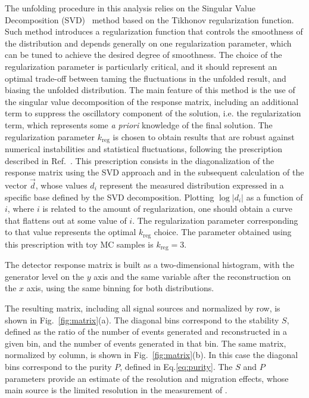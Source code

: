 The unfolding procedure in this analysis relies on the Singular Value Decomposition (SVD)~\cite{Hocker:1995kb} method based on the Tikhonov regularization function. Such method introduces a regularization function that controls the smoothness of the distribution and depends generally on one regularization parameter, which can be tuned to achieve the desired degree of smoothness.
The choice of the regularization parameter is particularly critical, and it should represent an optimal trade-off between taming the fluctuations in the unfolded result, and biasing the unfolded distribution.
The main feature of this method is the use of the singular value decomposition of the response matrix, including an additional term to suppress the oscillatory component of the solution, i.e. the regularization term, which represents some \textit{a priori} knowledge of the final solution.
The regularization parameter $k_\mathrm{reg}$ is chosen to obtain results that are robust against numerical instabilities and statistical fluctuations, following the prescription described in Ref.~\cite{Hocker:1995kb}. This prescription consists in the diagonalization of the response matrix using the SVD approach and in the subsequent calculation of the vector $\vec{d}$, whose values $d_i$ represent the measured distribution expressed in a specific base defined by the SVD decomposition. Plotting $\log|d_i|$ as a function of $i$, where $i$ is related to the amount of regularization, one should obtain a curve that flattens out at some value of $i$. The regularization parameter corresponding to that value represents the optimal $k_\mathrm{reg}$ choice. The parameter obtained using this prescription with toy MC samples is $k_\mathrm{reg} = 3$.

The detector response matrix is built as a two-dimensional histogram, with the generator level \pth on the $y$ axis and the same variable after the reconstruction on the $x$ axis, using the same binning for both distributions.

The resulting matrix, including all signal sources and normalized by row, is shown in Fig.~\ref{fig:matrix}(a).
The diagonal bins correspond to the stability $S$, defined as the ratio of the number of events generated and reconstructed in a given bin, and the number of events generated in that bin. The same matrix, normalized by column, is shown in Fig.~\ref{fig:matrix}(b). In this case the diagonal bins correspond to the purity $P$, defined in Eq.\eqref{eq:purity}. The $S$ and $P$ parameters provide an estimate of the \pth resolution and migration effects, whose main source is the limited resolution in the measurement of \MET.

